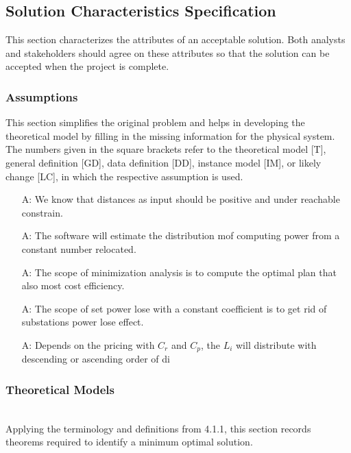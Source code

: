 \documentclass[12pt]{article}
\newcounter{assumpnum} %
\begin{document}
\subsection{Solution Characteristics Specification}

 {This section characterizes the attributes of an acceptable solution. Both analysts and stakeholders should agree on these attributes so that the solution can be accepted when the project is complete.}


\subsubsection{Assumptions} \label{sec_assumpt}


This section simplifies the original problem and helps in developing the
theoretical model by filling in the missing information for the physical
system. The numbers given in the square brackets refer to the theoretical model
[T], general definition [GD], data definition [DD], instance model [IM], or
likely change [LC], in which the respective assumption is used.
\begin{itemize}

\item[A\refstepcounter{assumpnum}\theassumpnum \label{as:n}:]
  We know that distances as input should be positive and under reachable constrain.

\item[A\refstepcounter{assumpnum}\theassumpnum \label{as:approximate}:]
  The software will estimate the distribution mof computing power from a constant number relocated. 

\item[A\refstepcounter{assumpnum}\theassumpnum \label{as:threeterm}:]
  The scope of minimization analysis is to compute the optimal plan that also most cost efficiency.

\item[A\refstepcounter{assumpnum}\theassumpnum \label{as:sixterm}:]
  The scope of set power lose with a constant coefficient is to get rid of substations power lose effect.
\item[A\refstepcounter{assumpnum}\theassumpnum \label{A_meaningfulLabel}:]
  {Depends on the pricing with $C_r$ and $C_p$,  the $L_i$ will distribute with descending or ascending order of di }

\end{itemize}

\subsubsection{Theoretical Models}\label{TM-series-cauchy-condition}\\
Applying the terminology and definitions from 4.1.1, this section records
theorems required to identify a minimum optimal solution.
\end{document}
